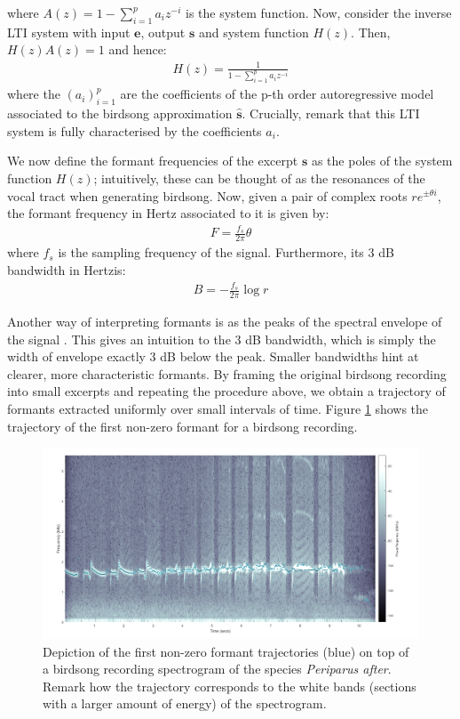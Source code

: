 \documentclass[pdftex,11pt,a4paper]{article}
\theoremstyle{definition}
\theoremstyle{remark}
\newcommand*{\V}[1]{\mathbf{#1}}%
\begin{document}
\par where $A(z) = 1 - \sum_{i=1}^pa_iz^{-i}$ is the system function. Now, consider the inverse LTI system with input $\V{e}$, output $\V{s}$ and system function $H(z)$. Then, $H(z)A(z) = 1$ and hence:
\begin{align*}
H(z) = \frac{1}{1-\sum_{i=1}^pa_iz^{-i}}
\end{align*}
where the $(a_i)_{i=1}^p$ are the coefficients of the p-th order autoregressive model associated to the birdsong approximation $\hat{\V{s}}$. Crucially, remark that this LTI system is fully characterised by the coefficients $a_i$. 
\par We now define the formant frequencies of the excerpt $\V{s}$ as the poles of the system function $H(z)$; intuitively, these can be thought of as the resonances of the vocal tract \cite{Prica2010} when generating birdsong. Now, given a pair of complex roots $re^{\pm\theta i}$, the formant frequency in Hertz associated to it is given by:
\begin{align*}
F = \frac{f_s}{2\pi}\theta
\end{align*}
where $f_s$ is the sampling frequency of the signal. Furthermore, its 3 dB bandwidth in Hertzis:
\begin{align*}
B = -\frac{f_s}{2\pi}\log{r}
\end{align*}
\par Another way of interpreting formants is as the peaks of the spectral envelope of the signal \cite{Darch}. This gives an intuition to the 3 dB bandwidth, which is simply the width of envelope exactly 3 dB below the peak. Smaller bandwidths hint at clearer, more characteristic formants. By framing the original birdsong recording into small excerpts and repeating the procedure above, we obtain a trajectory of formants extracted uniformly over small intervals of time. Figure \ref{fig_specformants} shows the trajectory of the first non-zero formant for a birdsong recording.

\begin{figure}[t]
\centering
\includegraphics[width=\textwidth]{images/formants}
\caption{Depiction of the first non-zero formant trajectories (blue) on top of a birdsong recording spectrogram of the species \emph{Periparus after}. Remark how the trajectory corresponds to the white bands (sections with a larger amount of energy) of the spectrogram.}
\label{fig_specformants}
\end{figure}
\end{document}
